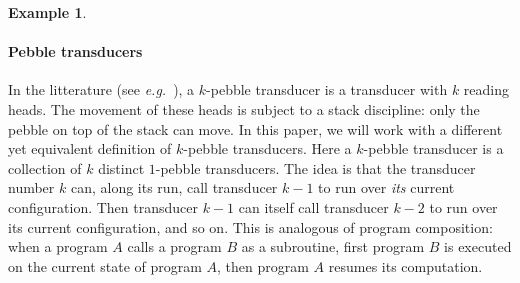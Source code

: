 \documentclass{article}
\theoremstyle{definition}
\newtheorem{example}[theorem]{Example}
\theoremstyle{remark}
\begin{document}
\begin{example}
\begin{center}

\end{center}

\end{example}


\paragraph{Pebble transducers}

In the litterature (see \textit{e.g.}~\cite{Bojanczyk18}), a $k$-pebble transducer is a transducer with $k$ reading heads. The movement of these heads is subject to a stack discipline: only the pebble on top of the stack can move.
In this paper, we will work with a different yet equivalent definition of $k$-pebble transducers. Here a $k$-pebble transducer is a collection of $k$ distinct $1$-pebble transducers. The idea is that the transducer number $k$ can, along its run, call transducer $k-1$ to run over \emph{its} current configuration. Then transducer $k-1$ can itself call transducer $k-2$ to run over its current configuration, and so on. This is analogous of program composition: when a program $A$ calls a program $B$ as a subroutine, first program $B$ is executed on the current state of program $A$, then program $A$ resumes its computation.
\end{document}
